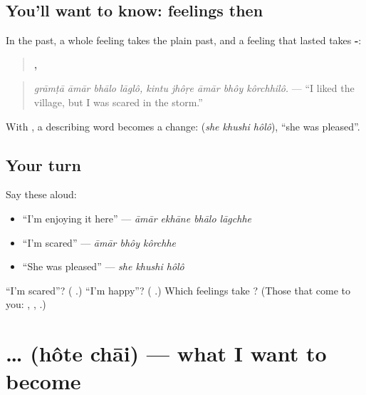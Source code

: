 \subsection*{You'll want to know: feelings then}
In the past, a whole feeling takes the plain past, and a feeling that lasted takes \textbf{-}:

\begin{quote}
\textbf{   ,     }
\end{quote}

\begin{quote}
\emph{grāmṭā āmār bhālo lāglô, kintu jhôṛe āmār bhôy kôrchhilô.} — \textquotedblleft{}I liked the village, but I was scared in the storm.\textquotedblright{}
\end{quote}

With \textbf{}, a describing word becomes a change: \textbf{  } (\emph{she khushi hôlô}), \textquotedblleft{}she was pleased\textquotedblright{}.

\subsection*{Your turn}
Say these aloud:

\begin{itemize}
\raggedright
  \item \textquotedblleft{}I'm enjoying it here\textquotedblright{} — \emph{āmār ekhāne bhālo lāgchhe}
  \item \textquotedblleft{}I'm scared\textquotedblright{} — \emph{āmār bhôy kôrchhe}
  \item \textquotedblleft{}She was pleased\textquotedblright{} — \emph{she khushi hôlô}
\end{itemize}

\begin{tcolorbox}[breakable,colback=teal!4,colframe=teal!35!black,title={Before you move on}]
\textquotedblleft{}I'm scared\textquotedblright{}? (\textbf{  }.) \textquotedblleft{}I'm happy\textquotedblright{}? (\textbf{ }.) Which feelings take \textbf{}? (Those that come to you: \textbf{ }, \textbf{}, \textbf{}.)
\end{tcolorbox}
\section[\texorpdfstring{… \bn{হতে} \bn{চাই} (… hôte chāi)}{… হতে চাই (… hôte chāi)}]{…   (hôte chāi) — what I want to become}

